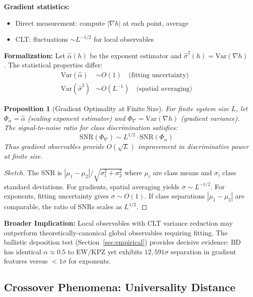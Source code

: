 \documentclass[aps,pre,reprint,amsmath,amssymb,superscriptaddress]{revtex4-2}
\newtheorem{proposition}{Proposition}
\begin{document}
\textbf{Gradient statistics:}
\begin{itemize}
\item Direct measurement: compute $|\nabla h|$ at each point, average
\item CLT: fluctuations $\sim L^{-1/2}$ for local observables
\end{itemize}

\textbf{Formalization:} Let $\hat{\alpha}(h)$ be the exponent estimator and $\hat{\sigma}^2(h) = \text{Var}(\nabla h)$. The statistical properties differ:
\begin{align}
\text{Var}(\hat{\alpha}) &\sim O(1) \quad \text{(fitting uncertainty)} \\
\text{Var}(\hat{\sigma}^2) &\sim O(L^{-1}) \quad \text{(spatial averaging)}
\end{align}

\begin{proposition}[Gradient Optimality at Finite Size]
\label{prop:gradient-optimal}
For finite system size $L$, let $\Phi_\alpha = \hat{\alpha}$ (scaling exponent estimator) and $\Phi_\nabla = \text{Var}(\nabla h)$ (gradient variance). The signal-to-noise ratio for class discrimination satisfies:
\begin{equation}
\text{SNR}(\Phi_\nabla) \sim L^{1/2} \cdot \text{SNR}(\Phi_\alpha)
\end{equation}
Thus gradient observables provide $O(\sqrt{L})$ improvement in discriminative power at finite size.
\end{proposition}

\begin{proof}[Sketch]
The SNR is $|\mu_1 - \mu_2|/\sqrt{\sigma_1^2 + \sigma_2^2}$ where $\mu_i$ are class means and $\sigma_i$ class standard deviations. For gradients, spatial averaging yields $\sigma \sim L^{-1/2}$. For exponents, fitting uncertainty gives $\sigma \sim O(1)$. If class separations $|\mu_1 - \mu_2|$ are comparable, the ratio of SNRs scales as $L^{1/2}$.
\end{proof}

\textbf{Broader Implication:} Local observables with CLT variance reduction may outperform theoretically-canonical global observables requiring fitting. The ballistic deposition test (Section~\ref{sec:empirical}) provides decisive evidence: BD has identical $\alpha \approx 0.5$ to EW/KPZ yet exhibits $12{,}591\sigma$ separation in gradient features versus $<1\sigma$ for exponents.

\subsection{Crossover Phenomena: Universality Distance}
\end{document}

